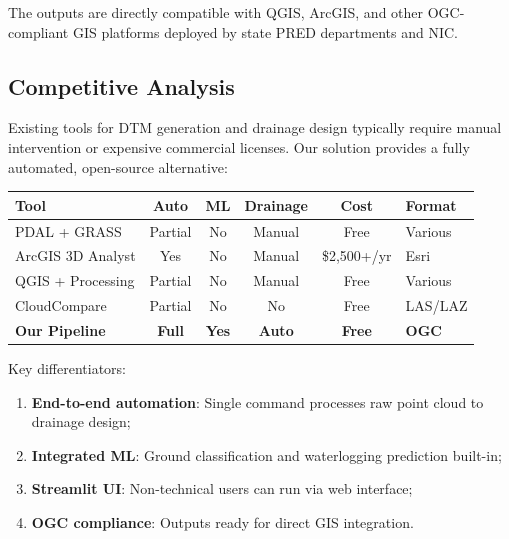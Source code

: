 \documentclass[a4paper,12pt]{article}
\begin{document}
The outputs are directly compatible with QGIS, ArcGIS, and other OGC-compliant GIS platforms deployed by state PRED departments and NIC.

\bigskip

\subsection{Competitive Analysis}

Existing tools for DTM generation and drainage design typically require manual intervention or expensive commercial licenses. Our solution provides a fully automated, open-source alternative:

{\small
\begin{table}[H]
	\centering
	\begin{tabular}{|l|c|c|c|c|p{2.5cm}|}
		\hline
		\textbf{Tool}         & \textbf{Auto} & \textbf{ML}  & \textbf{Drainage} & \textbf{Cost} & \textbf{Format} \\
		\hline
		PDAL + GRASS          & Partial       & No           & Manual            & Free          & Various         \\
		\hline
		ArcGIS 3D Analyst     & Yes           & No           & Manual            & \$2,500+/yr   & Esri            \\
		\hline
		QGIS + Processing     & Partial       & No           & Manual            & Free          & Various         \\
		\hline
		CloudCompare          & Partial       & No           & No                & Free          & LAS/LAZ         \\
		\hline
		\textbf{Our Pipeline} & \textbf{Full} & \textbf{Yes} & \textbf{Auto}     & \textbf{Free} & \textbf{OGC}    \\
		\hline
	\end{tabular}
\end{table}
}

\bigskip

Key differentiators:
\begin{enumerate}
	\item \textbf{End-to-end automation}: Single command processes raw point cloud to drainage design;
	\item \textbf{Integrated ML}: Ground classification and waterlogging prediction built-in;
	\item \textbf{Streamlit UI}: Non-technical users can run via web interface;
	\item \textbf{OGC compliance}: Outputs ready for direct GIS integration.
\end{enumerate}
\end{document}

